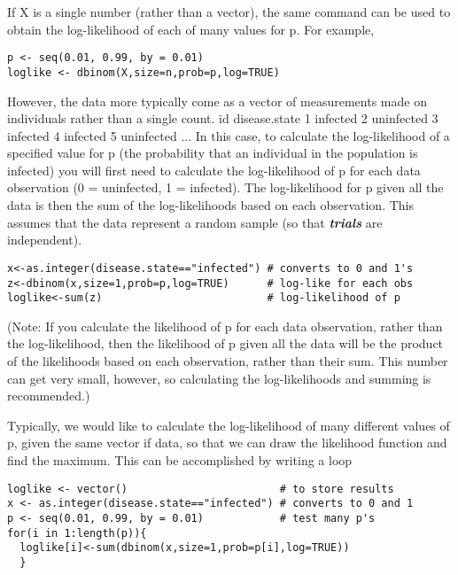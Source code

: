\documentclass[12pt, a4paper]{article}
\theoremstyle{plain}
\theoremstyle{definition}
\theoremstyle{remark}
\begin{document}
If X is a single number (rather than a vector), the same command can be used to obtain the log-likelihood of each of many values for p. For example,
\begin{framed}
\begin{verbatim}
p <- seq(0.01, 0.99, by = 0.01)
loglike <- dbinom(X,size=n,prob=p,log=TRUE)
\end{verbatim}
\end{framed}

However, the data more typically come as a vector of measurements made on individuals rather than a single count.
id disease.state
1 infected
2 uninfected
3 infected
4 infected
5 uninfected
...
In this case, to calculate the log-likelihood of a specified value for p (the probability that an individual in the population is infected) you will first need to calculate the log-likelihood of p for each data observation (0 = uninfected, 1 = infected). The log-likelihood for p given all the data is then the sum of the log-likelihoods based on each observation. This assumes that the data represent a random sample (so that \textbf{\textit{trials}} are independent).

\begin{framed}
\begin{verbatim}
x<-as.integer(disease.state=="infected") # converts to 0 and 1's
z<-dbinom(x,size=1,prob=p,log=TRUE)      # log-like for each obs
loglike<-sum(z)                          # log-likelihood of p
\end{verbatim}
\end{framed}

(Note: If you calculate the likelihood of p for each data observation, rather than the log-likelihood, then the likelihood of p given all the data will be the product of the likelihoods based on each observation, rather than their sum. This number can get very small, however, so calculating the log-likelihoods and summing is recommended.)

Typically, we would like to calculate the log-likelihood of many different values of p, given the same vector if data, so that we can draw the likelihood function and find the maximum. This can be accomplished by writing a loop
\begin{framed}
\begin{verbatim}
loglike <- vector()                        # to store results
x <- as.integer(disease.state=="infected") # converts to 0 and 1
p <- seq(0.01, 0.99, by = 0.01)            # test many p's
for(i in 1:length(p)){
  loglike[i]<-sum(dbinom(x,size=1,prob=p[i],log=TRUE))
  }
\end{verbatim}
\end{framed}
\end{document}
